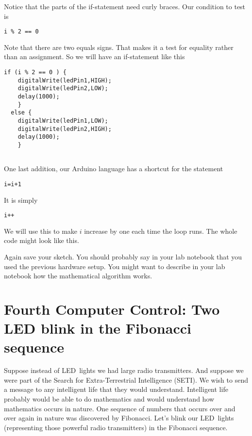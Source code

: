 Notice that the parts of the if-statement need curly braces. Our condition to test is

\begin{lstlisting}[language=Arduino]
  i % 2 == 0
\end{lstlisting}

Note that there are two equals signs. That makes it a test for equality rather than an assignment. So we will have an if-statement like this

 \begin{lstlisting}[language=Arduino]
  if (i % 2 == 0 ) {
    digitalWrite(ledPin1,HIGH);
    digitalWrite(ledPin2,LOW);
    delay(1000);
    }
  else {
    digitalWrite(ledPin1,LOW);
    digitalWrite(ledPin2,HIGH);
    delay(1000);
    }
 
 \end{lstlisting}

One last addition, our Arduino language has a shortcut for the statement

\begin{lstlisting}[language=Arduino]
  i=i+1
\end{lstlisting}

It is simply

\begin{lstlisting}[language=Arduino]
  i++
\end{lstlisting}

We will use this to make $i$ increase by one each time the loop runs. The whole code might look like this.



Again save your sketch. You should probably say in your lab notebook that
you used the previous hardware setup. You might want to describe in your lab
notebook how the mathematical algorithm works.

\section{Fourth Computer Control: Two LED blink in the Fibonacci sequence}

Suppose instead of LED\ lights we had large radio transmitters. And suppose
we were part of the Search for Extra-Terrestrial Intelligence (SETI). We
wish to send a message to any intelligent life that they would understand.
Intelligent life probably would be able to do mathematics and would
understand how mathematics occurs in nature. One sequence of numbers that
occurs over and over again in nature was discovered by Fibonacci. Let's
blink our LED\ lights (representing those powerful radio transmitters) in
the Fibonacci sequence.

